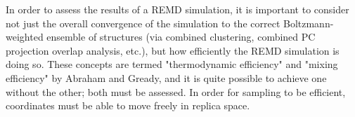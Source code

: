 
In order to assess the results of a REMD simulation, it is important to consider not just the overall convergence of the simulation to the correct Boltzmann-weighted ensemble of structures (via combined clustering, combined PC projection overlap analysis, etc.), but how efficiently the REMD simulation is doing so. These concepts are termed "thermodynamic efficiency" and "mixing efficiency" by Abraham and Gready,\citep{Abraham2008} and it is quite possible to achieve one without the other; both must be assessed. In order for sampling to be efficient, coordinates must be able to move freely in replica space.

